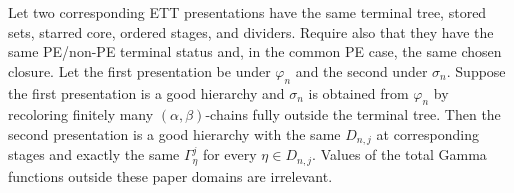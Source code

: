 \begin{lemma}
Let two corresponding ETT presentations have the same terminal tree,
stored sets, starred core, ordered stages, and dividers.  Require also
that they have the same PE/non-PE terminal status and, in the common PE
case, the same chosen closure.  Let the first presentation be under
$\varphi_n$ and the second under $\sigma_n$.  Suppose the first
presentation is a good hierarchy and $\sigma_n$ is obtained from
$\varphi_n$ by recoloring finitely many $(\alpha,\beta)$-chains fully
outside the terminal tree.  Then the second presentation is a good
hierarchy with the same $D_{n,j}$ at corresponding stages and exactly
the same $\Gamma^j_\eta$ for every $\eta\in D_{n,j}$.  Values of the
total Gamma functions outside these paper domains are irrelevant.
\end{lemma}
